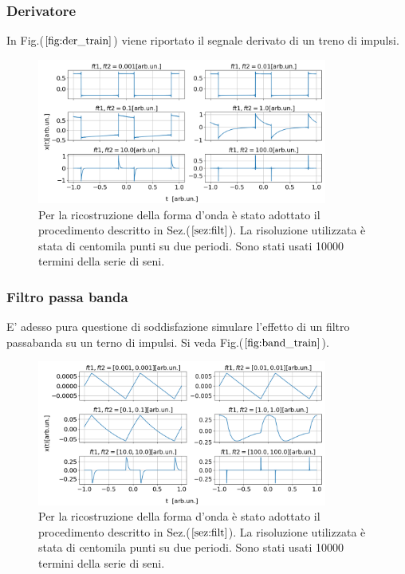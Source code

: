 \documentclass{article}
\begin{document}
            \subsubsection{Derivatore}
                In Fig.($\ref{fig:der_train}$) viene riportato il segnale derivato di un treno di impulsi.     
                    
                    \begin{figure}[H]
                        \centering
                        \includegraphics[width=0.85\textwidth]{der_train.png} %
                        \caption{Per la ricostruzione della forma d'onda è stato adottato 
                        il procedimento descritto in Sez.($\ref{sez:filt}$).
                        La risoluzione utilizzata è stata di centomila punti su due periodi.
                        Sono stati usati 10000 termini della serie di seni.}
                        \label{fig:der_train}
                    \end{figure}    

            \subsubsection{Filtro passa banda}
                E' adesso pura questione di soddisfazione simulare l'effetto
                di un filtro passabanda su un terno di impulsi. Si veda Fig.($\ref{fig:band_train}$).
                \begin{figure}[H]
                    \centering
                    \includegraphics[width=0.85\textwidth]{band_train.png} %
                    \caption{Per la ricostruzione della forma d'onda è stato adottato 
                    il procedimento descritto in Sez.($\ref{sez:filt}$).
                    La risoluzione utilizzata è stata di centomila punti su due periodi.
                    Sono stati usati 10000 termini della serie di seni.}
                    \label{fig:band_train}
                \end{figure}
\end{document}
